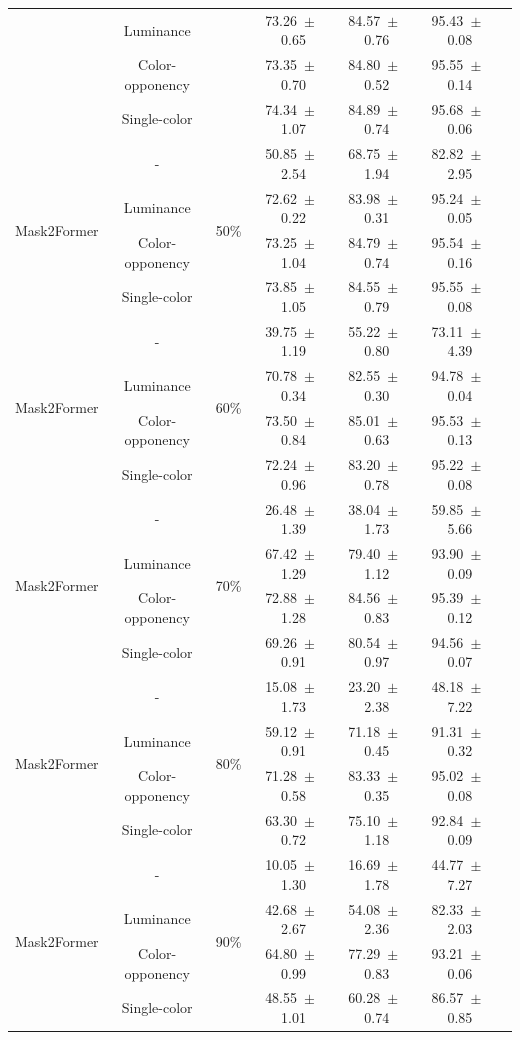 \begin{table}[h]
\begin{tabular}{@{}lccc ccc@{}}
& Luminance & & 73.26~$\pm$~0.65 & 84.57~$\pm$~0.76 & 95.43~$\pm$~0.08 \\
& Color-opponency & & 73.35~$\pm$~0.70 & 84.80~$\pm$~0.52 & 95.55~$\pm$~0.14 \\
& Single-color & & 74.34~$\pm$~1.07 & 84.89~$\pm$~0.74 & 95.68~$\pm$~0.06 \\
\midrule
\multirow{4}{*}{Mask2Former} & - & \multirow{4}{*}{50\%} & 50.85~$\pm$~2.54 & 68.75~$\pm$~1.94 & 82.82~$\pm$~2.95 \\
& Luminance & & 72.62~$\pm$~0.22 & 83.98~$\pm$~0.31 & 95.24~$\pm$~0.05 \\
& Color-opponency & & 73.25~$\pm$~1.04 & 84.79~$\pm$~0.74 & 95.54~$\pm$~0.16 \\
& Single-color & & 73.85~$\pm$~1.05 & 84.55~$\pm$~0.79 & 95.55~$\pm$~0.08 \\
\midrule
\multirow{4}{*}{Mask2Former} & - & \multirow{4}{*}{60\%} & 39.75~$\pm$~1.19 & 55.22~$\pm$~0.80 & 73.11~$\pm$~4.39 \\
& Luminance & & 70.78~$\pm$~0.34 & 82.55~$\pm$~0.30 & 94.78~$\pm$~0.04 \\
& Color-opponency & & 73.50~$\pm$~0.84 & 85.01~$\pm$~0.63 & 95.53~$\pm$~0.13 \\
& Single-color & & 72.24~$\pm$~0.96 & 83.20~$\pm$~0.78 & 95.22~$\pm$~0.08 \\
\midrule
\multirow{4}{*}{Mask2Former} & - & \multirow{4}{*}{70\%} & 26.48~$\pm$~1.39 & 38.04~$\pm$~1.73 & 59.85~$\pm$~5.66 \\
& Luminance & & 67.42~$\pm$~1.29 & 79.40~$\pm$~1.12 & 93.90~$\pm$~0.09 \\
& Color-opponency & & 72.88~$\pm$~1.28 & 84.56~$\pm$~0.83 & 95.39~$\pm$~0.12 \\
& Single-color & & 69.26~$\pm$~0.91 & 80.54~$\pm$~0.97 & 94.56~$\pm$~0.07 \\
\midrule
\multirow{4}{*}{Mask2Former} & - & \multirow{4}{*}{80\%} & 15.08~$\pm$~1.73 & 23.20~$\pm$~2.38 & 48.18~$\pm$~7.22 \\
& Luminance & & 59.12~$\pm$~0.91 & 71.18~$\pm$~0.45 & 91.31~$\pm$~0.32 \\
& Color-opponency & & 71.28~$\pm$~0.58 & 83.33~$\pm$~0.35 & 95.02~$\pm$~0.08 \\
& Single-color & & 63.30~$\pm$~0.72 & 75.10~$\pm$~1.18 & 92.84~$\pm$~0.09 \\
\midrule
\multirow{4}{*}{Mask2Former} & - & \multirow{4}{*}{90\%} & 10.05~$\pm$~1.30 & 16.69~$\pm$~1.78 & 44.77~$\pm$~7.27 \\
& Luminance & & 42.68~$\pm$~2.67 & 54.08~$\pm$~2.36 & 82.33~$\pm$~2.03 \\
& Color-opponency & & 64.80~$\pm$~0.99 & 77.29~$\pm$~0.83 & 93.21~$\pm$~0.06 \\
& Single-color & & 48.55~$\pm$~1.01 & 60.28~$\pm$~0.74 & 86.57~$\pm$~0.85 \\
\midrule
\bottomrule
\end{tabular}
\label{tab:sparse_results_mask2former_cityscapes}
\end{table}